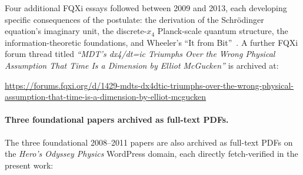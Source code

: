 \documentclass[11pt,a4paper]{article}
\begin{document}
Four additional FQXi essays followed between 2009 and 2013, each developing specific consequences of the postulate: the derivation of the Schr\"odinger equation's imaginary unit, the discrete-$x_4$ Planck-scale quantum structure, the information-theoretic foundations, and Wheeler's ``It from Bit''~\cite{mcguckenfqxi2009, mcguckenfqxi2010, mcguckenfqxi2012, mcguckenfqxi2013}. A further FQXi forum thread titled \emph{``MDT's dx4/dt=ic Triumphs Over the Wrong Physical Assumption That Time Is a Dimension by Elliot McGucken''} is archived at:
\begin{center}
\url{https://forums.fqxi.org/d/1429-mdts-dx4dtic-triumphs-over-the-wrong-physical-assumption-that-time-is-a-dimension-by-elliot-mcgucken}
\end{center}

\paragraph{Three foundational papers archived as full-text PDFs.} The three foundational 2008--2011 papers are also archived as full-text PDFs on the \emph{Hero's Odyssey Physics} WordPress domain, each directly fetch-verified in the present work:
\end{document}
